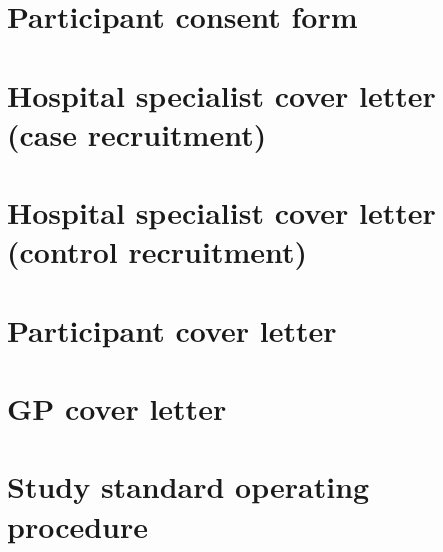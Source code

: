 \documentclass[a4paper,10pt]{article}
\begin{document}
\begin{appendices}
\section{Participant consent form}

\newpage

\section{Hospital specialist cover letter (case recruitment)}

\newpage

\section{Hospital specialist cover letter (control recruitment)}

\newpage

\section{Participant cover letter}

\newpage

\section{GP cover letter}

\newpage

\section{Study standard operating procedure}

\newpage


\end{appendices}
     
\makeatletter
 \def\@biblabel#1{#1}
\makeatother



\end{document}
